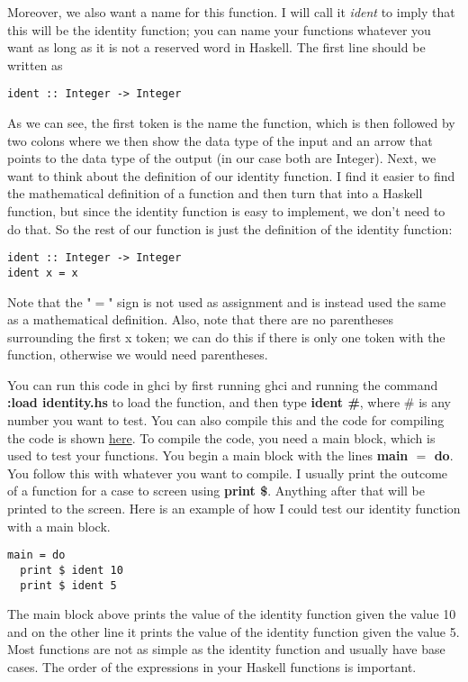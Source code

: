 \documentclass{article}
\begin{document}
\vspace{\baselineskip}
Moreover, we also want a name for this function. I will call it \textit{ident} to imply that this will be the identity function; you can name your functions whatever you want as long as it is not a reserved word in Haskell. The first line should be written as 
\begin{lstlisting}
ident :: Integer -> Integer
\end{lstlisting}
As we can see, the first token is the name the function, which is then followed by two colons where we then show the data type of the input and an arrow that points to the data type of the output (in our case both are Integer). Next, we want to think about the definition of our identity function. I find it easier to find the mathematical definition of a function and then turn that into a Haskell function, but since the identity function is easy to implement, we don't need to do that. So the rest of our function is just the definition of the identity function:
\begin{lstlisting}
ident :: Integer -> Integer
ident x = x
\end{lstlisting}
Note that the "$=$" sign is not used as assignment and is instead used the same as a mathematical definition. Also, note that there are no parentheses surrounding the first x token; we can do this if there is only one token with the function, otherwise we would need parentheses.

\vspace{\baselineskip}
You can run this code in ghci by first running ghci and running the command \textbf{:load identity.hs} to load the function, and then type \textbf{ident \#}, where \# is any number you want to test. You can also compile this and the code for compiling the code is shown \href{https://replit.com/@ArielGutierrez/Identity#main.hs}{here}. To compile the code, you need a main block, which is used to test your functions. You begin a main block with the lines \textbf{main $=$ do}. You follow this with whatever you want to compile. I usually print the outcome of a function for a case to screen using \textbf{print \$}. Anything after that will be printed to the screen. Here is an example of how I could test our identity function with a main block.

\begin{lstlisting}
main = do
  print $ ident 10
  print $ ident 5
\end{lstlisting}
The main block above prints the value of the identity function given the value 10 and on the other line it prints the value of the identity function given the value 5.
Most functions are not as simple as the identity function and usually have base cases. The order of the expressions in your Haskell functions is important. 
\end{document}
